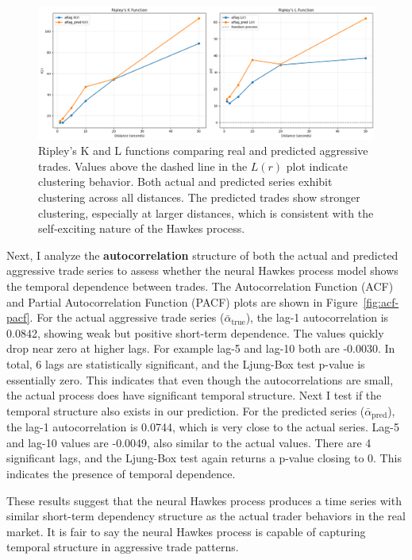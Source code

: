 \begin{figure}[H]
    \centering
    \includegraphics[width=\linewidth]{figures/RIPLEY_181330.png}
    \caption{Ripley's K and L functions comparing real and predicted aggressive trades. Values above the dashed line in the \( L(r) \) plot indicate clustering behavior. Both actual and predicted series exhibit clustering across all distances. The predicted trades show stronger clustering, especially at larger distances, which is consistent with the self-exciting nature of the Hawkes process.}
    \label{fig:ripley-kl}
\end{figure}



Next, I analyze the \textbf{autocorrelation} structure of both the actual and predicted aggressive trade series to assess whether the neural Hawkes process model shows the temporal dependence between trades. The Autocorrelation Function (ACF) and Partial Autocorrelation Function (PACF) plots are shown in Figure~\ref{fig:acf-pacf}. For the actual aggressive trade series ($\bar{\alpha}_\text{true}$), the lag-1 autocorrelation is 0.0842, showing weak but positive short-term dependence. The values quickly drop near zero at higher lags. For example lag-5 and lag-10 both are -0.0030. In total, 6 lags are statistically significant, and the Ljung-Box test p-value is essentially zero. This indicates that even though the autocorrelations are small, the actual process does have significant temporal structure. Next I test if the temporal structure also exists in our prediction. For the predicted series ($\bar{\alpha}_\text{pred}$), the lag-1 autocorrelation is 0.0744, which is very close to the actual series. Lag-5 and lag-10 values are -0.0049, also similar to the actual values. There are 4 significant lags, and the Ljung-Box test again returns a p-value closing to 0. This indicates the presence of temporal dependence.

These results suggest that the neural Hawkes process produces a time series with similar short-term dependency structure as the actual trader behaviors in the real market. It is fair to say the neural Hawkes process is capable of capturing temporal structure in aggressive trade patterns.

